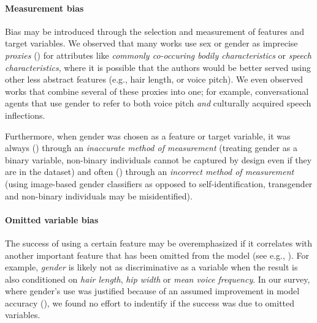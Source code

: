 \documentclass[nonacm,sigconf,review,balance=false]{acmart}
\begin{document}
\paragraph*{Measurement bias} Bias may be introduced through the selection and measurement of features and target variables.
We observed that many works use sex or gender as imprecise \emph{proxies} (\var) for attributes like \emph{commonly co-occuring bodily characteristics} or \emph{speech characteristics}, where it is possible that the authors would be better served using other less abstract features (e.g., hair length, or voice pitch). We even observed works that combine several of these proxies into one; for example,
conversational agents that use gender to refer to both voice pitch \emph{and} culturally acquired speech inflections.

Furthermore, when gender was chosen as a feature or target variable, it was always (\binary) through an \emph{inaccurate method of measurement} (treating gender as a binary variable, non-binary individuals cannot be captured by design even if they are in the dataset) and often (\classifier) through an \emph{incorrect method of measurement} (using image-based gender classifiers as opposed to self-identification, transgender and non-binary individuals may be misidentified).

\paragraph*{Omitted variable bias} The success of using a certain feature may be overemphasized if it correlates with another important feature that has been omitted from the model (see e.g., \cite{clarke2005phantom}). For example, \emph{gender} is likely not as discriminative as a variable when the result is also conditioned on \emph{hair length}, \emph{hip width} or \emph{mean voice frequency}. In our survey, where gender's use was justified because of an assumed improvement in model accuracy (\var), we found no effort to indentify if the success was due to omitted variables.
\end{document}
